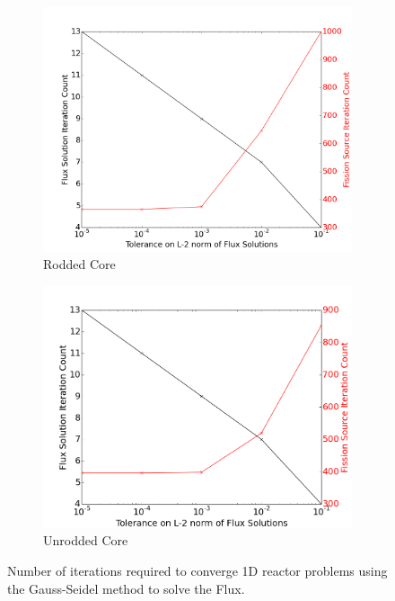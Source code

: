 \documentclass[12pt]{report}
\begin{document}
				\begin{figure}[ht]
					\centering
					\begin{subfigure}{.5\textwidth}
						\centering
						\includegraphics[width=.9\linewidth]{rod_GS.png}
						\caption{Rodded Core}
						\label{fig::rod_gs}
					\end{subfigure}%
					\begin{subfigure}{.5\textwidth}
						\centering
						\includegraphics[width=.9\linewidth]{urod_GS.png}
						\caption{Unrodded Core}
						\label{fig::urod_gs}
					\end{subfigure}
					\caption{Number of iterations required to converge 1D reactor problems using the Gauss-Seidel method to solve the Flux.}
					\label{fig::GS_convergence}
				\end{figure}
	
\end{document}
